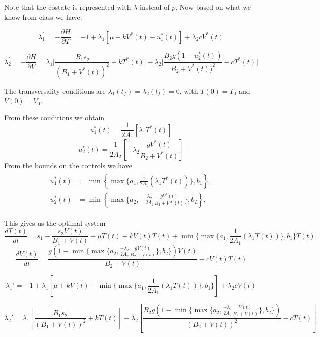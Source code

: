 Note that the costate is represented with $\lambda$ instead of $p$. Now based on what we know from class we have:

$$\lambda_1^{'} =-\frac{\partial H}{\partial T} =  -1+\lambda_1[\mu+kV^*(t)-u_1^*(t)]+\lambda_2cV^*(t)$$

$$\lambda_2^{'} = -\frac{\partial H}{\partial V} = \lambda_1\Big[\frac{B_1s_2}{(B_1+V^*(t))^2}+kT^*(t)\Big] -\lambda_2\Big[\frac{B_2g(1-u_2^*(t))}{B_2+V^*(t))^2}-cT^*(t)\Big]$$

The transversality conditions are $\lambda_1(t_f)=\lambda_2(t_f)=0$, with $T(0)=T_0$ and $V(0)=V_0$. 







From these conditions we obtain
$$u_1^*(t) = \frac{1}{2A_1}[\lambda_1T^*(t)]$$
$$u_2^*(t) = \frac{1}{2A_2}[-\lambda_2\frac{gV^*(t)}{B_2+V^*(t)}]$$
From the bounds on the controls we have
\begin{align*}
	\begin{split}
		u_1^*(t)&=\min\left\{\max\{a_1,\frac{1}{2A_1}(\lambda_1T^*(t))\},b_1\right\},\\
		u_2^*(t)&=\min\left\{\max\{a_2,-\frac{\lambda_2}{2A_2}\frac{gV^*(t)}{B_2+V*(t)}\},b_2\right\}.
	\end{split}
\end{align*}

This gives us the optimal system
$$\frac{dT(t)}{dt}=s_1-\frac{s_2V(t)}{B_1+V(t)}-\mu T(t)-kV(t)T(t)+\min\{\max\{a_1,\frac{1}{2A_1}(\lambda_1T(t))\},b_1\}T(t)$$
$$\frac{dV(t)}{dt}=\frac{g(1-\min\{\max\{a_2,\frac{-\lambda_2}{2A_2}\frac{gV(t)}{B_2+V(t)}\},b_2\})V(t)}{B_2+V(t)}-cV(t)T(t)$$

$$\lambda_1'=-1+\lambda_1[\mu+kV(t)-\min\{\max\{a_1,\frac{1}{2A_1}(\lambda_1T(t))\},b_1\}]+\lambda_2cV(t)$$

$$\lambda_2'=\lambda_1[\frac{B_1s_2}{(B_1+V(t))^2}+kT(t)]-\lambda_2[\frac{B_2g(1-\min\{\max\{a_2,\frac{-\lambda_2}{2A_2}\frac{V(t)}{B_2+V(t)}\},b_2\})}{(B_2+V(t))^2}-cT(t)]$$

